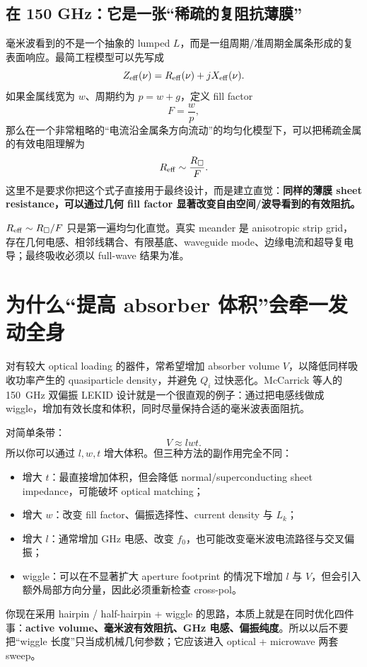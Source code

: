 \documentclass[11pt,a4paper,openany]{ctexrep}
\begin{document}
\subsection{在 150 GHz：它是一张“稀疏的复阻抗薄膜”}

毫米波看到的不是一个抽象的 lumped $L$，而是一组周期/准周期金属条形成的复表面响应。最简工程模型可以先写成
\[
Z_{\rm eff}(\nu)=R_{\rm eff}(\nu)+jX_{\rm eff}(\nu).
\]
如果金属线宽为 $w$、周期约为 $p=w+g$，定义 fill factor
\[
F=\frac{w}{p},
\]
那么在一个非常粗略的“电流沿金属条方向流动”的均匀化模型下，可以把稀疏金属的有效电阻理解为
\[
R_{\rm eff}\sim \frac{R_{\square}}{F}.
\]
这里不是要求你把这个式子直接用于最终设计，而是建立直觉：\textbf{同样的薄膜 sheet resistance，可以通过几何 fill factor 显著改变自由空间/波导看到的有效阻抗。}

\begin{mistakebox}
$R_{\rm eff}\sim R_{\square}/F$ 只是第一遍均匀化直觉。真实 meander 是 anisotropic strip grid，存在几何电感、相邻线耦合、有限基底、waveguide mode、边缘电流和超导复电导；最终吸收必须以 full-wave 结果为准。
\end{mistakebox}

\section{为什么“提高 absorber 体积”会牵一发动全身}

对有较大 optical loading 的器件，常希望增加 absorber volume $V$，以降低同样吸收功率产生的 quasiparticle density，并避免 $Q_i$ 过快恶化。McCarrick 等人的 \SI{150}{GHz} 双偏振 LEKID 设计就是一个很直观的例子：通过把电感线做成 wiggle，增加有效长度和体积，同时尽量保持合适的毫米波表面阻抗。

对简单条带：
\[
V\approx lwt.
\]
所以你可以通过 $l,w,t$ 增大体积。但三种方法的副作用完全不同：
\begin{itemize}
  \item 增大 $t$：最直接增加体积，但会降低 normal/superconducting sheet impedance，可能破坏 optical matching；
  \item 增大 $w$：改变 fill factor、偏振选择性、current density 与 $L_k$；
  \item 增大 $l$：通常增加 GHz 电感、改变 $f_0$，也可能改变毫米波电流路径与交叉偏振；
  \item wiggle：可以在不显著扩大 aperture footprint 的情况下增加 $l$ 与 $V$，但会引入额外局部方向分量，因此必须重新检查 cross-pol。
\end{itemize}

\begin{projectbox}
你现在采用 hairpin / half-hairpin + wiggle 的思路，本质上就是在同时优化四件事：\textbf{active volume、毫米波有效阻抗、GHz 电感、偏振纯度}。所以以后不要把“wiggle 长度”只当成机械几何参数；它应该进入 optical + microwave 两套 sweep。
\end{projectbox}
\end{document}
